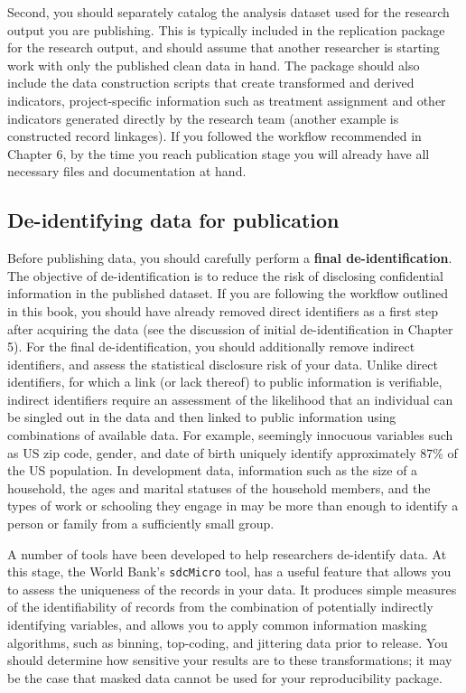 Second, you should separately catalog
the analysis dataset used for the research output you are publishing.
This is typically included in the replication package for the research output,
and should assume that another researcher is starting work
with only the published clean data in hand.
The package should also include the data construction scripts
that create transformed and derived indicators,
project-specific information
such as treatment assignment and other indicators
generated directly by the research team (another example is constructed record linkages).
If you followed the workflow recommended in Chapter 6,
by the time you reach publication stage you will already have all necessary
files and documentation at hand.

\subsection{De-identifying data for publication}

Before publishing data,
you should carefully perform a \textbf{final de-identification}.
The objective of de-identification is to reduce the risk of disclosing confidential information in the published dataset.
If you are following the workflow outlined in this book,
you should have already removed direct identifiers as a first step after acquiring the data
(see the discussion of initial de-identification in Chapter 5).
For the final de-identification, you should additionally remove
indirect identifiers, and assess the statistical disclosure risk of your data.
Unlike direct identifiers, for which a link (or lack thereof) to public information is verifiable,
indirect identifiers require an assessment of the likelihood
that an individual can be singled out in the data
and then linked to public information using combinations of available data.
For example, seemingly innocuous variables such as US zip code,
gender, and date of birth uniquely identify
approximately 87\% of the US population.
In development data, information such as the size of a household,
the ages and marital statuses of the household members,
and the types of work or schooling they engage in
may be more than enough to identify a person or family
from a sufficiently small group.

A number of tools have been developed to help researchers de-identify data.
At this stage, the World Bank's \texttt{sdcMicro} tool,
has a useful feature
that allows you to assess the uniqueness of the records in your data.
It produces simple measures of the identifiability of records from
the combination of potentially indirectly identifying variables,
and allows you to apply common information masking algorithms,
such as binning, top-coding, and jittering data prior to release.
You should determine how sensitive your results are to these transformations;
it may be the case that masked data cannot be used for your reproducibility package.

